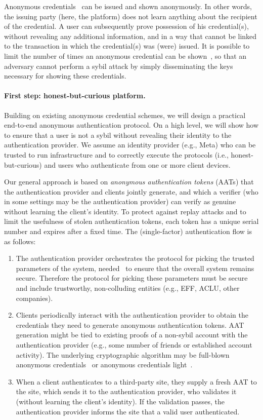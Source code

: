 Anonymous credentials~\cite{} can be issued and shown anonymously.
% 
In other words, the issuing party (here, the platform) does not learn anything about the recipient of the credential.
%
A user can subsequently prove possession of his credential(s), without revealing any additional information, and in a way that cannot be linked to the transaction in which the credential(s) was (were) issued.
%
It is possible to limit the number of times an anonymous credential can be shown~\cite{}, so that an adversary cannot perform a sybil attack by simply disseminating the keys necessary for showing these credentials.

\paragraph{First step: honest-but-curious platform.} Building on existing anonymous credential schemes, we will design a practical end-to-end anonymous authentication protocol. On a high level, we will show how to ensure that a user is not a sybil without revealing their identity to the authentication provider. We assume an identity provider (e.g., Meta) who can be trusted to run infrastructure and to correctly execute the protocols (i.e., honest-but-curious) and users who authenticate from one or more client devices.

Our general approach is based on \emph{anonymous authentication tokens} (AATs) that the authentication provider and clients jointly generate, and which a verifier (who in some settings may be the authentication provider) can verify as genuine without learning the client’s identity. To protect against replay attacks and to limit the usefulness of stolen authentication tokens, each token has a unique serial number and expires after a fixed time. The (single-factor) authentication flow is as follows:
\begin{enumerate}[nosep]
\item The authentication provider orchestrates the protocol for picking the trusted parameters of the system, needed~\cite{lr22} to ensure that the overall system remains secure. Therefore the protocol for picking these parameters must be secure and include trustworthy, non-colluding entities (e.g., EFF, ACLU, other companies).
\item Clients periodically interact with the authentication provider to obtain the credentials they need to generate anonymous authentication tokens. AAT generation might be tied to existing proofs of a non-sybil account with the authentication provider (e.g., some number of friends or established account activity). The underlying cryptographic algorithm may be full-blown anonymous credentials~\cite{EC:camlys01} or anonymous credentials light~\cite{CCS:ballys13}.
\item When a client authenticates to a third-party site, they supply a fresh AAT to the site, which sends it to the authentication provider, who validates it (without learning the client’s identity). If the validation passes, the authentication provider informs the site that a valid user authenticated.
\end{enumerate}

